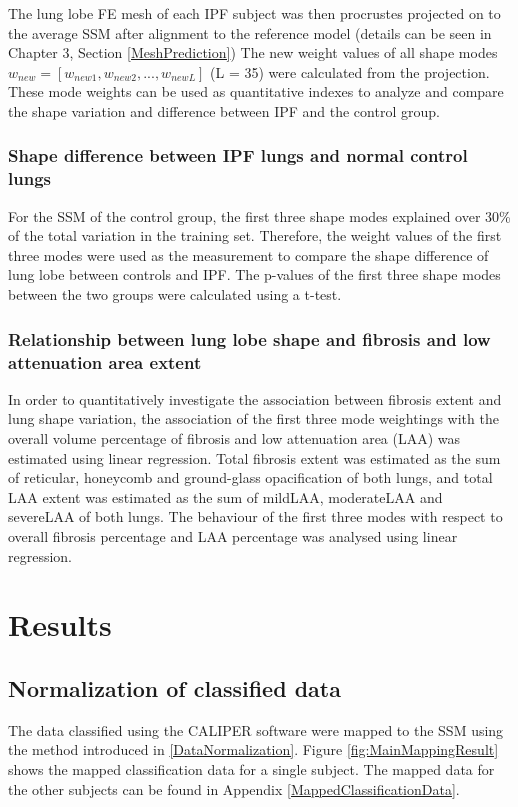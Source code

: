 The lung lobe FE mesh of each IPF subject was then procrustes projected on to the average SSM after alignment to the reference model (details can be seen in Chapter 3, Section \ref{MeshPrediction}) The new weight values of all shape modes $w_{new} = [w_{new1}, w_{new2},...,w_{newL}]$ (L = 35) were calculated from the projection. These mode weights can be used as quantitative indexes to analyze and compare the shape variation and difference between IPF and the control group.

\subsubsection{Shape difference between IPF lungs and normal control lungs}

For the SSM of the control group, the first three shape modes explained over 30\% of the total variation in the training set. Therefore, the weight values of the first three modes were used as the measurement to compare the shape difference of lung lobe between controls and IPF. The p-values of the first three shape modes between the two groups were calculated using a t-test.

\subsubsection{Relationship between lung lobe shape and fibrosis and low attenuation area extent}
In order to quantitatively investigate the association between fibrosis extent and lung shape variation, the association of the first three mode weightings with the overall volume percentage of fibrosis and low attenuation area (LAA) was estimated using linear regression. Total fibrosis extent was estimated as the sum of reticular, honeycomb and ground-glass opacification of both lungs, and total LAA extent was estimated as the sum of mildLAA,  moderateLAA and severeLAA of both lungs. The behaviour of the first three modes with respect to overall fibrosis percentage and LAA percentage was analysed using linear regression.

\section{Results}
\subsection{Normalization of classified data}
The data classified using the CALIPER software were mapped to the SSM using the method introduced in \ref{DataNormalization}. Figure \ref{fig:MainMappingResult} shows the mapped classification data for a single subject. The mapped data for the other subjects can be found in Appendix \ref{MappedClassificationData}.

